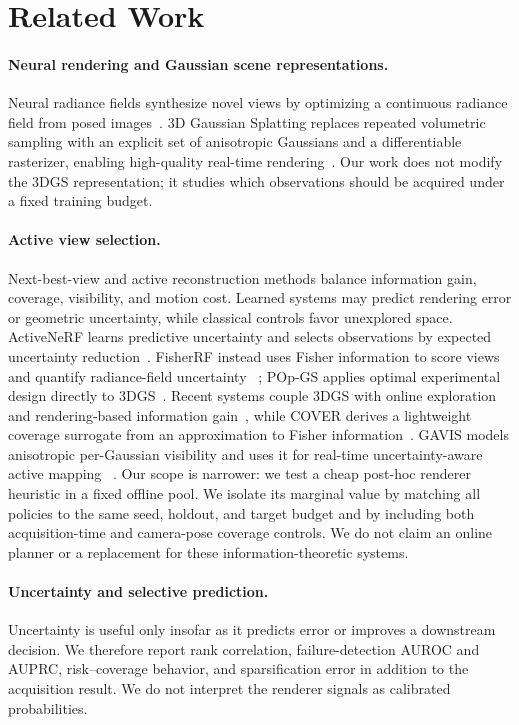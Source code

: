 \section{Related Work}

\paragraph{Neural rendering and Gaussian scene representations.}
Neural radiance fields synthesize novel views by optimizing a continuous
radiance field from posed images~\cite{mildenhall2020nerf}.  3D Gaussian
Splatting replaces repeated volumetric sampling with an explicit set of
anisotropic Gaussians and a differentiable rasterizer, enabling high-quality
real-time rendering~\cite{kerbl20233dgs}.  Our work does not modify the 3DGS
representation; it studies which observations should be acquired under a fixed
training budget.

\paragraph{Active view selection.}
Next-best-view and active reconstruction methods balance information gain,
coverage, visibility, and motion cost.  Learned systems may predict rendering
error or geometric uncertainty, while classical controls favor unexplored
space.  ActiveNeRF learns predictive uncertainty and selects observations by
expected uncertainty reduction~\cite{pan2022activenerf}.  FisherRF instead uses
Fisher information to score views and quantify radiance-field uncertainty
~\cite{jiang2024fisherrf}; POp-GS applies optimal experimental design directly
to 3DGS~\cite{wilson2025popgs}.  Recent systems couple 3DGS with online
exploration and rendering-based information gain~\cite{chen2025activegamer},
while COVER derives a lightweight coverage surrogate from an approximation to
Fisher information~\cite{chen2026cover}.  GAVIS models anisotropic per-Gaussian
visibility and uses it for real-time uncertainty-aware active mapping
~\cite{xue2026gavis}.  Our scope is narrower: we test a cheap post-hoc renderer
heuristic in a fixed offline pool.  We isolate its marginal value by matching
all policies to the same seed, holdout, and target budget and by including both
acquisition-time and camera-pose coverage controls.  We do not claim an online
planner or a replacement for these information-theoretic systems.

\paragraph{Uncertainty and selective prediction.}
Uncertainty is useful only insofar as it predicts error or improves a downstream
decision.  We therefore report rank correlation, failure-detection AUROC and
AUPRC, risk--coverage behavior, and sparsification error in addition to the
acquisition result.  We do not interpret the renderer signals as calibrated
probabilities.

